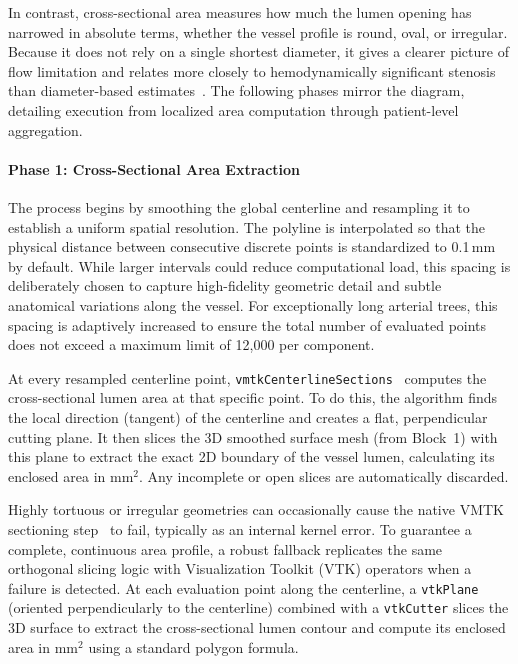 In contrast, cross-sectional area measures how much the lumen opening has narrowed in absolute terms, whether the vessel profile is round, oval, or irregular. Because it does not rely on a single shortest diameter, it gives a clearer picture of flow limitation and relates more closely to hemodynamically significant stenosis than diameter-based estimates~\cite{plank2016}. The following phases mirror the diagram, detailing execution from localized area computation through patient-level aggregation.

\paragraph{Phase 1: Cross-Sectional Area Extraction}\mbox{}\par\vspace{0.5em}
The process begins by smoothing the global centerline and resampling it to establish a uniform spatial resolution. The polyline is interpolated so that the physical distance between consecutive discrete points is standardized to 0.1\,mm by default. While larger intervals could reduce computational load, this spacing is deliberately chosen to capture high-fidelity geometric detail and subtle anatomical variations along the vessel. For exceptionally long arterial trees, this spacing is adaptively increased to ensure the total number of evaluated points does not exceed a maximum limit of 12{,}000 per component.

At every resampled centerline point, \texttt{vmtkCenterlineSections}~\cite{izzo2018,piccinelli2009} computes the cross-sectional lumen area at that specific point. To do this, the algorithm finds the local direction (tangent) of the centerline and creates a flat, perpendicular cutting plane. It then slices the 3D smoothed surface mesh (from Block~1) with this plane to extract the exact 2D boundary of the vessel lumen, calculating its enclosed area in mm$^2$. Any incomplete or open slices are automatically discarded.

Highly tortuous or irregular geometries can occasionally cause the native VMTK sectioning step~\cite{izzo2018} to fail, typically as an internal kernel error. To guarantee a complete, continuous area profile, a robust fallback replicates the same orthogonal slicing logic with Visualization Toolkit (VTK) operators when a failure is detected. At each evaluation point along the centerline, a \texttt{vtkPlane} (oriented perpendicularly to the centerline) combined with a \texttt{vtkCutter} slices the 3D surface to extract the cross-sectional lumen contour and compute its enclosed area in mm$^2$ using a standard polygon formula.

